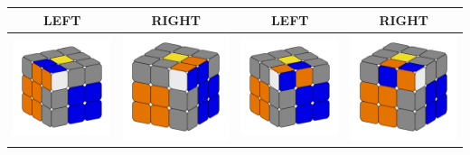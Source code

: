 \documentclass[12pt, a3paper]{article}
\newcommand{\scale}{1}
\begin{document}
\pagestyle{empty}

\begin{center}
	\begin{longtable}{c|c||c|c}
	\Large{LEFT} & \Large{RIGHT} & \Large{LEFT} & \Large{RIGHT}\vspace{1ex}\\
	\hline
	\includegraphics[scale=\scale]{1_left} & \includegraphics[scale=\scale]{1_right}  &  \includegraphics[scale=\scale]{2_left} & \includegraphics[scale=\scale]{2_right} \\

\end{longtable}
\end{center}
\end{document}
